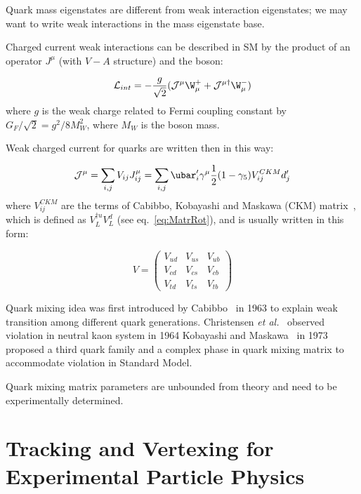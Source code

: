 Quark mass eigenstates are different from weak interaction
 eigenstates; we may want to write weak interactions in the mass
 eigenstate base.

Charged current weak interactions can be described in SM by the product of
 an operator $J^{\mu}$ (with $V-A$ structure) and the \W boson:

\begin{equation}
\mathcal{L}_{int}=-\frac{g}{\sqrt{2}}(\mathcal{J^{\mu}}\W_{\mu}^{+}+\mathcal{J^{\mu\dagger}}\W_{\mu}^{-})
\label{eq:LintWeak}
\end{equation}
where $g$ is the weak charge related to Fermi coupling constant by 
$G_F/\sqrt{2}=g^2/8M_W^2$, where $M_W$ is the \W boson mass.

Weak charged current for quarks are written then in this way:

\begin{equation}
\mathcal{J}^{\mu} = \sum_{i,j} V_{ij}J^{\mu}_{ij} = 
\sum_{i,j}\ubar_i' \gamma^{\mu}\frac{1}{2}(1-\gamma_5)V^{CKM}_{ij}d_j'
\label{eq:ChCurr}
\end{equation}
where $V^{CKM}_{ij}$ are the terms of Cabibbo, Kobayashi and Maskawa (CKM) 
matrix~\cite{PhysRevLett.10.531,Kobayashi:1973fv}, which is defined as $V_L^{\dagger u}V_L^{d}$ 
(see eq.~\ref{eq:MatrRot}), and is usually written in this form:

\begin{equation}
V=
\left( \begin{array}{ccc}
V_{ud} & V_{us} & V_{ub} \\
V_{cd} & V_{cs} & V_{cb} \\
V_{td} & V_{ts} & V_{tb}
\end{array} \right)
\label{eq:CKM}
\end{equation}


Quark mixing idea was first introduced by Cabibbo~\cite{PhysRevLett.10.531} in 1963 
to explain weak transition among different quark generations. 
Christensen {\it et al.}~\cite{PhysRevLett.13.138} observed \CP violation in
 neutral kaon system in 1964 
 Kobayashi and Maskawa~\cite{Kobayashi:1973fv} in 1973 proposed a third quark family and a
 complex phase in quark mixing matrix to accommodate \CP violation in
 Standard Model.

Quark mixing matrix parameters are unbounded from theory and need to be 
experimentally determined. 

\section{Tracking and Vertexing for Experimental Particle Physics}

